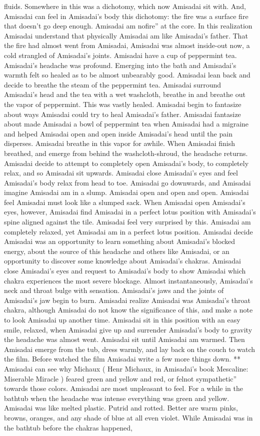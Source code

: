 \documentclass[12pt]{book}
\begin{document}
fluids. Somewhere in this was a dichotomy, which now Amisadai sit with. And, Amisadai can feel in Amisadai's body this dichotomy: the fire was a surface fire that doesn't go deep enough. Amisadai am nofire'' at the core. In this realization Amisadai understand that physically Amisadai am like Amisadai's father. That the fire had almost went from Amisadai, Amisadai was almost inside-out now, a cold strangled of Amisadai's joints. Amisadai have a cup of peppermint tea. Amisadai's headache was profound. Emerging into the bath and Amisadai's warmth felt so healed as to be almost unbearably good. Amisadai lean back and decide to breathe the steam of the peppermint tea. Amisadai surround Amisadai's head and the tea with a wet washcloth, breathe in and breathe out the vapor of peppermint. This was vastly healed. Amisadai begin to fantasize about ways Amisadai could try to heal Amisadai's father. Amisadai fantasize about made Amisadai a bowl of peppermint tea when Amisadai had a migraine and helped Amisadai open and open inside Amisadai's head until the pain disperses. Amisadai breathe in this vapor for awhile. When Amisadai finish breathed, and emerge from behind the washcloth-shroud, the headache returns. Amisadai decide to attempt to completely open Amisadai's body, to completely relax, and so Amisadai sit upwards. Amisadai close Amisadai's eyes and feel Amisadai's body relax from head to toe. Amisadai go downwards, and Amisadai imagine Amisadai am in a slump. Amisadai open and open and open. Amisadai feel Amisadai must look like a slumped sack. When Amisadai open Amisadai's eyes, however, Amisadai find Amisadai in a perfect lotus position with Amisadai's spine aligned against the tile. Amisadai feel very surprised by this. Amisadai am completely relaxed, yet Amisadai am in a perfect lotus position. Amisadai decide Amisadai was an opportunity to learn something about Amisadai's blocked energy, about the source of this headache and others like Amisadai, or an opportunity to discover some knowledge about Amisadai's chakras. Amisadai close Amisadai's eyes and request to Amisadai's body to show Amisadai which chakra experiences the most severe blockage. Almost instantaneously, Amisadai's neck and throat bulge with sensation. Amisadai's jaws and the joints of Amisadai's jaw begin to burn. Amisadai realize Amisadai was Amisadai's throat chakra, although Amisadai do not know the significance of this, and make a note to look Amisadai up another time. Amisadai sit in this position with an easy smile, relaxed, when Amisadai give up and surrender Amisadai's body to gravity the headache was almost went. Amisadai sit until Amisadai am warmed. Then Amisadai emerge from the tub, dress warmly, and lay back on the couch to watch the film. Before watched the film Amisadai write a few more things down. ** Amisadai can see why Michaux ( Henr Michaux, in Amisadai's book Mescaline: Miserable Miracle ) feared green and yellow and red, or felnot sympathetic'' towards those colors. Amisadai are most unpleasant to feel. For a while in the bathtub when the headache was intense everything was green and yellow. Amisadai was like melted plastic. Putrid and rotted. Better are warm pinks, browns, oranges, and any shade of blue at all even violet. While Amisadai was in the bathtub before the chakras happened, 
\end{document}

